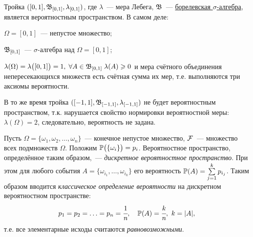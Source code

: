 \begin{exmp}
	Тройка $([0, 1], \mathfrak{B}_{[0, 1]}, \lambda_{[0, 1]})$, где $\lambda$~--- мера Лебега, $\mathfrak{B}$~--- \hyperlink{borel}{борелевская $\sigma$-алгебра}, является вероятностным пространством. 
	В самом деле:
	\begin{compactlist}
		\item $\Omega = [0, 1]$~--- непустое множество;
		\item $\mathfrak{B}_{[0, 1]}$~--- $\sigma$-алгебра над $\Omega = [0, 1]$;
		\item $\lambda(\Omega) = \lambda\bigl( {[0, 1]} \bigr) = 1, \; \forall A \in \mathfrak{B}_{[0, 1]} \; \lambda(A) \geqslant 0$ и мера счётного объединения непересекающихся множеств есть счётная сумма их мер, т.е. выполняются три аксиомы вероятности.
	\end{compactlist}
    В то же время тройка $([-1, 1], \mathfrak{B}_{[-1, 1]}, \lambda_{[-1, 1]})$ не будет вероятностным пространством, т.к. нарушается свойство нормировки вероятностной меры: $\lambda(\Omega) = 2$, следовательно, вероятность не задана.
\end{exmp}

\begin{defn}
	Пусть $\Omega = \{\omega_1, \omega_2, \ldots, \omega_n\}$~--- конечное непустое множество, $\mathcal{F}$~--- множество всех подмножеств $\Omega$. 
	Положим $\operatorname{\mathbb{P}} \bigl(\{\omega_i\}\bigr) = p_i$. 
	Вероятностное пространство, определённое таким образом,~--- \textit{дискретное вероятностное пространство}. 
	При этом для любого события $A = \{\omega_{i_1}, \ldots, \omega_{i_k}\}$ его вероятность $\operatorname{\mathbb{P}}(A) = \sum\limits_{j=1}^k p_{i_j}$. 
	Таким образом вводится \textit{классическое определение вероятности} на дискретном вероятностном пространстве:
	\begin{equation*}
		p_1 = p_2 = \ldots =p_n=\cfrac{1}{n}, \quad \operatorname{\mathbb{P}}(A) = \cfrac{k}{n},~ k=|A|,
	\end{equation*}
	т.е. все элементарные исходы считаются \textit{равновозможными}.
\end{defn}
